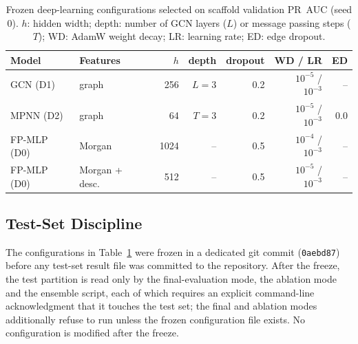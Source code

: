 \begin{table}[t]
\caption{Frozen deep-learning configurations selected on scaffold validation PR~AUC (seed 0). $h$: hidden width; depth: number of GCN layers ($L$) or message passing steps ($T$); WD: AdamW weight decay; LR: learning rate; ED: edge dropout.}
\label{tab:dl_configs}
\centering\footnotesize
\setlength{\tabcolsep}{3.5pt}
\begin{tabular}{@{}llrrrrr@{}}
\toprule
Model & Features & $h$ & depth & dropout & WD / LR & ED \\
\midrule
GCN (D1)   & graph        & 256  & $L=3$ & 0.2 & $10^{-5}$ / $10^{-3}$ & -- \\
MPNN (D2)  & graph        & 64   & $T=3$ & 0.2 & $10^{-5}$ / $10^{-3}$ & 0.0 \\
FP-MLP (D0) & Morgan      & 1024 & --    & 0.5 & $10^{-4}$ / $10^{-3}$ & -- \\
FP-MLP (D0) & Morgan + desc.\ & 512 & --  & 0.5 & $10^{-5}$ / $10^{-3}$ & -- \\
\bottomrule
\end{tabular}
\end{table}

\subsection{Test-Set Discipline}
The configurations in Table~\ref{tab:dl_configs} were frozen in a dedicated git commit (\texttt{0aebd87}) before any test-set result file was committed to the repository. After the freeze, the test partition is read only by the final-evaluation mode, the ablation mode and the ensemble script, each of which requires an explicit command-line acknowledgment that it touches the test set; the final and ablation modes additionally refuse to run unless the frozen configuration file exists. No configuration is modified after the freeze.
